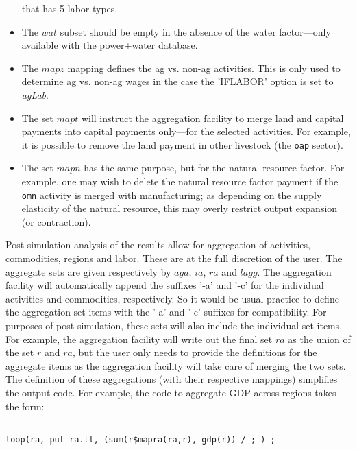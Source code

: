 \begin{itemize}
         that has 5 labor types. \item The $\mathit{wat}$ subset should be empty
         in the absence of the water factor---only available with the
         power+water database.
   \item The $\mathit{mapz}$ mapping defines the ag vs. non-ag activities. This
         is only used to determine ag vs. non-ag wages in the case the 'IFLABOR'
         option is set to \emph{agLab}.
   \item The set $\mathit{mapt}$ will instruct the aggregation facility to merge
         land and capital payments into capital payments only---for the selected
         activities. For example, it is possible to remove the land payment in
         other livestock (the \texttt{oap} sector).
   \item The set $\mathit{mapn}$ has the same purpose, but for the natural
         resource factor. For example, one may wish to delete the natural
         resource factor payment if the \texttt{omn} activity is merged with
         manufacturing; as depending on the supply elasticity of the natural
         resource, this may overly restrict output expansion (or contraction).
\end{itemize}

Post-simulation analysis of the results allow for aggregation of activities,
commodities, regions and labor. These are at the full discretion of the user.
The aggregate sets are given respectively by $\mathit{aga}$, $\mathit{ia}$,
$\mathit{ra}$ and $\mathit{lagg}$. The aggregation facility will automatically
append the suffixes '-a' and '-c' for the individual activities and commodities,
respectively. So it would be usual practice to define the aggregation set items
with the '-a' and '-c' suffixes for compatibility. For purposes of
post-simulation, these sets will also include the individual set items. For
example, the aggregation facility will write out the final set $\mathit{ra}$ as
the union of the set $\mathit{r}$ and $\mathit{ra}$, but the user only needs to
provide the definitions for the aggregate items as the aggregation facility will
take care of merging the two sets. The definition of these aggregations (with
their respective mappings) simplifies the output code. For example, the code to
aggregate GDP across regions takes the form:

\begin{lstlisting}[language=GAMS]

loop(ra, put ra.tl, (sum(r$mapra(ra,r), gdp(r)) / ; ) ;

\end{lstlisting}

